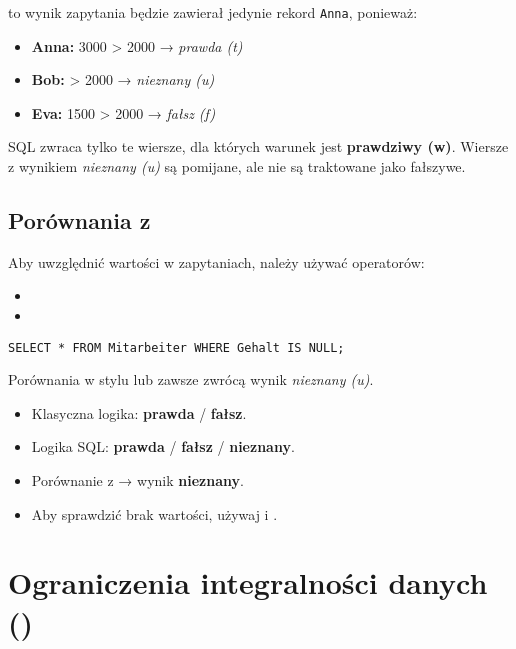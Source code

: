 to wynik zapytania będzie zawierał jedynie rekord \texttt{Anna}, ponieważ:
\begin{itemize}
    \item \textbf{Anna:} 3000 > 2000 → \textit{prawda (t)}
    \item \textbf{Bob:}  > 2000 → \textit{nieznany (u)}
    \item \textbf{Eva:} 1500 > 2000 → \textit{fałsz (f)}
\end{itemize}

SQL zwraca tylko te wiersze, dla których warunek jest \textbf{prawdziwy (w)}.  
Wiersze z wynikiem \textit{nieznany (u)} są pomijane, ale nie są traktowane jako fałszywe.

\subsection{Porównania z }

Aby uwzględnić wartości  w zapytaniach, należy używać operatorów:
\begin{itemize}
    \item {}
    \item {}
\end{itemize}

\begin{lstlisting}[style=sqlstyle]
SELECT * FROM Mitarbeiter WHERE Gehalt IS NULL;
\end{lstlisting}

Porównania w stylu  lub  zawsze zwrócą wynik \textit{nieznany (u)}.

\begin{itemize}
    \item Klasyczna logika: \textbf{prawda} / \textbf{fałsz}.
    \item Logika SQL: \textbf{prawda} / \textbf{fałsz} / \textbf{nieznany}.
    \item Porównanie z  → wynik \textbf{nieznany}.
    \item Aby sprawdzić brak wartości, używaj  i .
\end{itemize}

\section{Ograniczenia integralności danych ()\label{sql:constraints}}

